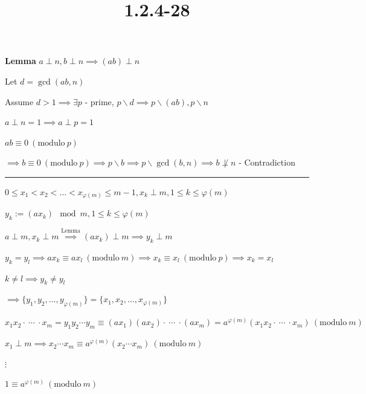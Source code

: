 \documentclass{article}
\title{1.2.4-28}
\begin{document}
\maketitle

\textbf{Lemma} \( a \perp n, b \perp n \implies (ab) \perp n \)

Let \( d = \gcd(ab, n) \)

Assume \( d > 1 \implies \exists p \) - prime, \( p \backslash d \implies p \backslash (ab), p \backslash n \)

\( a \perp n = 1 \implies a \perp p = 1 \)

\( ab \equiv 0\ (\mathrm{modulo}\ p) \)

\( \implies b \equiv 0\ (\mathrm{modulo}\ p) \implies p \backslash b \implies p \backslash \gcd(b,n) \implies b \not\perp n \) - Contradiction

\bigskip\hrule\bigskip

\( 0 \leq x_1 < x_2 < \ldots < x_{\varphi(m)} \leq m - 1, x_k \perp m, 1 \leq k \leq \varphi(m) \)

\( y_k := (ax_k) \mod m, 1 \leq k \leq \varphi(m) \)

\( a \perp m, x_k \perp m \overset{\text{Lemma}}{\implies} (ax_k) \perp m \implies y_k \perp m \)

\( y_k = y_l \implies ax_k \equiv ax_l \ (\mathrm{modulo}\ m) \implies x_k \equiv x_l\ (\mathrm{modulo}\ p) \implies x_k = x_l \)

\( k \neq l \implies y_k \neq y_l \)

\( \implies \{ y_1, y_2, \ldots, y_{\varphi(m)} \} = \{ x_1, x_2, \ldots, x_{\varphi(m)} \} \)

\( x_1x_2 \cdot\ \cdots\ \cdot x_m = y_1y_2\cdots y_m \equiv (ax_1)(ax_2) \cdot\ \cdots\ \cdot (ax_m) = a^{\varphi(m)}(x_1x_2 \cdot\ \cdots\ \cdot x_m)\ (\mathrm{modulo}\ m) \)

\( x_1 \perp m \implies x_2 \cdots x_m \equiv a^{\varphi(m)}(x_2\cdots x_m)\ (\mathrm{modulo}\ m) \)

\( \vdots \)

\( 1 \equiv a^{\varphi(m)} \ (\mathrm{modulo}\ m) \)
\end{document}
